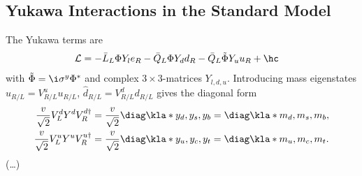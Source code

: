 \documentclass[english, parskip=full]{scrbook}
\begin{document}
\subsection{Yukawa Interactions in the Standard Model}
The Yukawa terms are
\begin{align}
\mathcal{L} &= -\bar{L}_L \Phi Y_l e_R - \bar{Q}_L\Phi Y_d d_R - \bar{Q}_L \tilde{\Phi} Y_u u_R + \hc
\end{align}
with $\tilde{\Phi}=\i\sigma^y \Phi^\ast$ and complex $3\times 3$-matrices $Y_{l,d,u}$.
Introducing mass eigenstates $\hat{u}_{R/L} = V_{R/L}^u u_{R/L}$, $\hat{d}_{R/L} = V_{R/L}^d d_{R/L}$ gives the diagonal form
\begin{align}
\frac{v}{\sqrt{2}} V_L^d Y^d V_R^{d\dagger} &= \frac{v}{\sqrt{2}} \diag\kla*{y_d,y_s,y_b} = \diag\kla*{m_d,m_s,m_b},\\
\frac{v}{\sqrt{2}} V_L^u Y^u V_R^{u\dagger} &= \frac{v}{\sqrt{2}} \diag\kla*{y_u,y_c,y_t} = \diag\kla*{m_u,m_c,m_t}.
\end{align}
(\dots)
\end{document}
